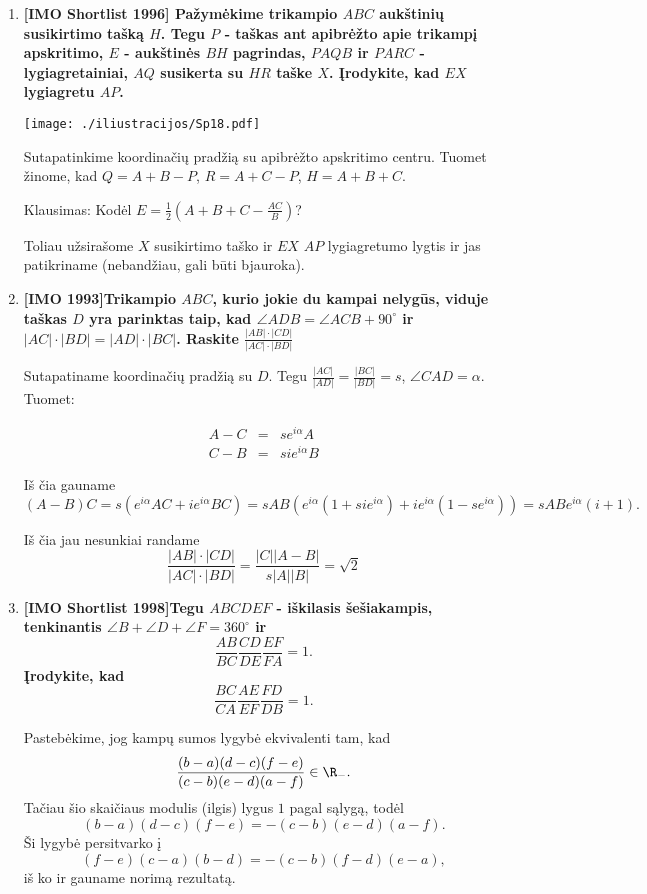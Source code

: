 \begin{enumerate}
\medskip

\item \textbf{[IMO Shortlist 1996] Pažymėkime trikampio $ABC$ aukštinių susikirtimo tašką $H$. Tegu $P$ - taškas ant apibrėžto apie trikampį apskritimo, $E$ - aukštinės $BH$ pagrindas, $PAQB$ ir $PARC$ - lygiagretainiai, $AQ$ susikerta su $HR$ taške $X$. Įrodykite, kad $EX$ lygiagretu $AP$.}
\medskip

\texttt{[image: ./iliustracijos/Sp18.pdf]}

Sutapatinkime koordinačių pradžią su apibrėžto apskritimo centru. Tuomet žinome, kad $Q = A + B - P$, $R = A + C - P$, $H = A + B + C.$

Klausimas: Kodėl $E = \frac{1}{2}(A+B+C - \frac{AC}{B})$?

Toliau užsirašome $X$ susikirtimo taško ir $EX$ $AP$ lygiagretumo lygtis ir jas patikriname (nebandžiau, gali būti bjauroka). 
\medskip

\item \textbf{[IMO 1993]Trikampio $ABC$, kurio jokie du kampai nelygūs, viduje taškas $D$ yra parinktas taip, kad $\angle ADB = \angle ACB + 90^{\circ}$ ir $|AC|\cdot|BD| = |AD|\cdot|BC|$. Raskite $\frac{|AB|\cdot|CD|}{|AC|\cdot|BD|}$}
\medskip

Sutapatiname koordinačių pradžią su $D$. Tegu $\frac{|AC|}{|AD|} = \frac{|BC|}{|BD|} = s$, $\angle CAD = \alpha$.
Tuomet: 

\begin{eqnarray*}
A-C &=& se^{i\alpha}A\\
C-B &=& sie^{i\alpha}B
\end{eqnarray*}

Iš čia gauname $$(A-B)C = s(e^{i\alpha}AC + ie^{i\alpha}BC) = sAB(e^{i\alpha}(1+sie^{i\alpha}) + ie^{i\alpha}(1-se^{i\alpha})) = sABe^{i\alpha}(i+1).$$ 

Iš čia jau nesunkiai randame $$\frac{|AB|\cdot|CD|}{|AC|\cdot|BD|}=\frac{|C||A-B|}{s|A||B|} = \sqrt{2}$$
\medskip

\item \textbf{[IMO Shortlist 1998]Tegu $ABCDEF$ - iškilasis šešiakampis, tenkinantis $\angle B + \angle D + \angle F = 360^{\circ}$ ir $$\frac{AB}{BC}\frac{CD}{DE}\frac{EF}{FA} = 1.$$ Įrodykite, kad $$\frac{BC}{CA}\frac{AE}{EF}\frac{FD}{DB} = 1.$$}
\medskip

Pastebėkime, jog kampų sumos lygybė ekvivalenti tam, kad $$\frac{(b-a)(d-c)(f-e)}{(c-b)(e-d)(a-f)} \in \R_{-}.$$
Tačiau šio skaičiaus modulis (ilgis) lygus $1$ pagal sąlygą, todėl 
$$(b-a)(d-c)(f-e) = - (c-b)(e-d)(a-f).$$ Ši lygybė persitvarko į 
$$(f - e)(c - a)(b - d) = -(c - b)(f - d)(e - a),$$ iš ko ir gauname norimą rezultatą. 

\end{enumerate}
